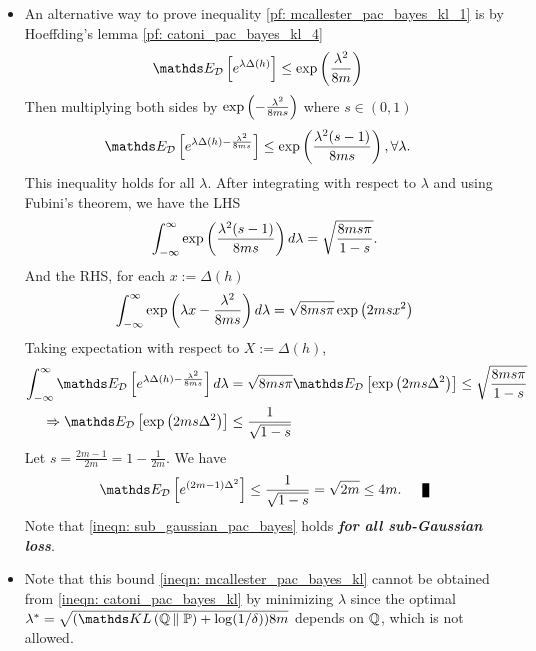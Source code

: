 \documentclass[11pt]{article}
\begin{document}
\begin{itemize}
\item \begin{remark}
An alternative way to prove inequality \eqref{pf: mcallester_pac_bayes_kl_1} is by Hoeffding's lemma \eqref{pf: catoni_pac_bayes_kl_4}
\begin{align*}
\E{\cD}{e^{\lambda  \Delta(h)}} &\le \exp\paren{\frac{\lambda^2}{8m}}
\end{align*} Then multiplying both sides by $\exp\left(-\frac{\lambda^2}{8m s}\right)$ where $s \in (0,1)$
\begin{align*}
\E{\cD}{e^{\lambda  \Delta(h) -\frac{\lambda^2}{8m s} }} &\le \exp\paren{\frac{\lambda^2(s-1)}{8ms}}, \forall \lambda.
\end{align*} This inequality holds for all $\lambda$. After integrating with respect to $\lambda$ and using Fubini's theorem, we have the LHS
\begin{align*}
\int_{-\infty}^{\infty}\exp\left(\frac{\lambda^2(s-1)}{8ms}\right)d\lambda = \sqrt{\frac{8ms \pi}{1-s}}.
\end{align*} And the RHS, for each $x:=\Delta(h)$
\begin{align*}
\int_{-\infty}^{\infty}\exp\left(\lambda x -\frac{\lambda^2}{8m s} \right)d\lambda = \sqrt{8ms \pi}\exp\left(2m s x^2\right)
\end{align*} Taking expectation with respect to $X := \Delta(h)$,
\begin{align}
\int_{-\infty}^{\infty}\E{\cD}{e^{\lambda  \Delta(h) -\frac{\lambda^2}{8m s} }} d\lambda &= \sqrt{8ms \pi}\E{\cD}{\exp\paren{2m s\Delta^2}} \le \sqrt{\frac{8ms \pi}{1-s}} \\
\Rightarrow \E{\cD}{\exp\paren{2m s\Delta^2}} &\le \frac{1}{\sqrt{1 - s}} \label{ineqn: sub_gaussian_pac_bayes}
\end{align} Let $s = \frac{2m - 1}{2m}= 1 - \frac{1}{2m}$. We have
\begin{align*}
\E{\cD}{e^{(2m -1)\Delta^2}} \le \frac{1}{\sqrt{1 - s}} = \sqrt{2m} \le 4m. \qed
\end{align*} Note that \eqref{ineqn: sub_gaussian_pac_bayes} holds \emph{\textbf{for all sub-Gaussian loss}}.
\end{remark}

\item \begin{remark}
Note that this bound  \eqref{ineqn: mcallester_pac_bayes_kl} cannot be obtained from \eqref{ineqn: catoni_pac_bayes_kl} by minimizing $\lambda$ since the optimal $\lambda^{*}= \sqrt{(\kl{\bQ}{\bP}  + \log(1/\delta)) 8m}$ depends on ${\mathbb Q}$, which is not allowed. 


\end{remark}
\end{itemize}
\end{document}
